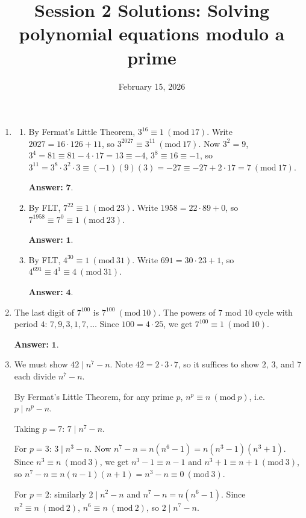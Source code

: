 \documentclass[12pt]{article}
\title{Session 2 Solutions: Solving polynomial equations modulo a prime}
\date{February 15, 2026}
\newcommand{\Mod}[1]{\ (\mathrm{mod}\ #1)}
\begin{document}
\maketitle

\begin{enumerate}

\item
\begin{enumerate}
  \item[(a)] By Fermat's Little Theorem, $3^{16} \equiv 1 \Mod{17}$.
  Write $2027 = 16 \cdot 126 + 11$, so $3^{2027} \equiv 3^{11} \Mod{17}$.
  Now $3^2=9$, $3^4=81\equiv 81-4\cdot17=13\equiv -4$, $3^8\equiv 16\equiv -1$,
  so $3^{11}=3^8\cdot 3^2\cdot 3 \equiv (-1)(9)(3)=-27\equiv -27+2\cdot17=7\Mod{17}$.

  \textbf{Answer: }$\mathbf{7}$.

  \item[(b)] By FLT, $7^{22}\equiv 1\Mod{23}$.
  Write $1958 = 22\cdot 89 + 0$, so $7^{1958}\equiv 7^0 \equiv 1\Mod{23}$.

  \textbf{Answer: }$\mathbf{1}$.

  \item[(c)] By FLT, $4^{30}\equiv 1\Mod{31}$.
  Write $691 = 30\cdot 23 + 1$, so $4^{691}\equiv 4^1 \equiv 4\Mod{31}$.

  \textbf{Answer: }$\mathbf{4}$.
\end{enumerate}

\item The last digit of $7^{100}$ is $7^{100}\Mod{10}$.
The powers of $7$ mod $10$ cycle with period $4$: $7,9,3,1,7,\ldots$
Since $100=4\cdot 25$, we get $7^{100}\equiv 1\Mod{10}$.

\textbf{Answer: }$\mathbf{1}$.

\item We must show $42 \mid n^7-n$. Note $42=2\cdot 3\cdot 7$, so it suffices to show $2$, $3$, and $7$ each divide $n^7-n$.

By Fermat's Little Theorem, for any prime $p$, $n^p \equiv n \Mod{p}$, i.e.\ $p\mid n^p - n$.

Taking $p=7$: $7\mid n^7-n$.

For $p=3$: $3\mid n^3-n$. Now $n^7-n = n(n^6-1)=n(n^3-1)(n^3+1)$.
Since $n^3\equiv n\Mod{3}$, we get $n^3-1\equiv n-1$ and $n^3+1\equiv n+1\Mod{3}$,
so $n^7-n\equiv n(n-1)(n+1)=n^3-n\equiv 0\Mod{3}$.

For $p=2$: similarly $2\mid n^2-n$ and $n^7-n = n(n^6-1)$. Since $n^2\equiv n\Mod{2}$, $n^6\equiv n\Mod{2}$, so $2\mid n^7-n$.


\end{enumerate}
\end{document}
